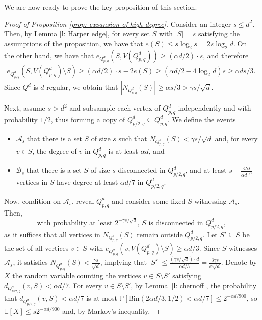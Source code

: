 \documentclass{article}
\theoremstyle{definition}
\newcommand{\cB}{\mathcal{B}}
\begin{document}
We are now ready to prove the key proposition of this section.
\begin{proof}[Proof of Proposition \ref{prop: expansion of high degree}]
Consider an integer $s\le d^2$.
Then, by Lemma \ref{l: Harper edge}, for every set $S$ with $|S|=s$ satisfying the assumptions of the proposition, we have that $e(S)\le s\log_2s=2s\log_2d$. 
On the other hand, we have that $e_{Q^d_{p,q}}(S,V(Q^d_{p,q}))\ge (\alpha d/2)\cdot s$, and therefore 
    \begin{align*}
        e_{Q^d_{p,q}}(S,V(Q^d_{p,q})\setminus S)\ge (\alpha d/2)\cdot s-2e(S)\ge (\alpha d/2-4\log_2d)s\ge \alpha ds/3.
    \end{align*}
    Since $Q^d$ is $d$-regular, we obtain that $|N_{Q^d_{p,q}}(S)|\ge \alpha s/3>\gamma s/\sqrt{d}$.

    Next, assume $s>d^2$ and subsample each vertex of $Q^d_{p,q}$ independently and with probability $1/2$, thus forming a copy of $Q^d_{p/2,q}\subseteq Q^d_{p,q}$. We define the events
    \begin{itemize}
        \item $\mathcal{A}_s$ that there is a set $S$ of size $s$ such that $N_{Q^d_{p,q}}(S)<\gamma s/\sqrt{d}$ and, for every $v\in S$, the degree of $v$ in $Q^d_{p,q}$ is at least $\alpha d$, and
        \item $\cB_s$ that there is a set $S$ of size $s$ disconnected in $Q^d_{p/2,q}$, and at least $s-\frac{4\gamma s}{\alpha d^{1/2}}$ vertices in $S$ have degree at least $\alpha d/7$ in $Q^d_{p/2,q}$.
    \end{itemize}
    Now, condition on $\mathcal{A}_s$, reveal $Q^d_{p,q}$ and consider some fixed $S$ witnessing $\mathcal{A}_s$. 
    Then, 
    \begin{equation}\label{eq:cn1}
    \text{with probability at least $2^{-\gamma s/\sqrt{d}}$, $S$ is disconnected in $Q^d_{p/2,q}$,}
    \end{equation}
    as it suffices that all vertices in $N_{Q^d_{p,q}}(S)$ remain outside $Q^d_{p/2,q}$. 
    Let $S'\subseteq S$ be the set of all vertices $v\in S$ with $e_{Q^d_{p,q}}(v,V(Q^d_{p,q})\setminus S)\ge \alpha d/3$. 
    Since $S$ witnesses $\mathcal{A}_s$, it satisfies $N_{Q^d_{p,q}}(S)<\frac{\gamma s}{\sqrt{d}}$, implying that $|S'|\le \frac{(\gamma s/\sqrt{d})\cdot d}{\alpha d/3} = \frac{3\gamma s}{\alpha \sqrt{d}}$. 
    Denote by $X$ the random variable counting the vertices $v\in S\setminus S'$ satisfying $d_{Q^d_{p/2,q}}(v,S)<\alpha d/7$.
    For every $v\in S\setminus S'$, by Lemma~\ref{l: chernoff}, the probability that $d_{Q^d_{p/2,q}}(v,S)<\alpha d/7$ is at most $\mathbb P[\mathrm{Bin}(2\alpha d/3,1/2)<\alpha d/7]\le 2^{-\alpha d/900}$, so $\mathbb E[X]\le s 2^{-\alpha d/900}$ and, by Markov's inequality,

\end{proof}
\end{document}
